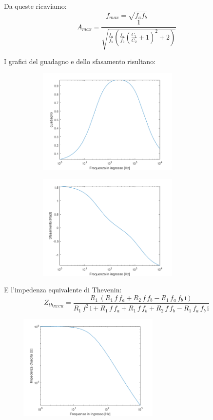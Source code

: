 Da queste ricaviamo:
\begin{equation}
    f_{max} = \sqrt{f_a f_b}
\end{equation}
\begin{equation}
    A_{max} = \frac{1}{\sqrt{\frac{f_a}{f_b}(\frac{f_a}{f_b}(\frac{C_1}{C_2} + 1)^2 + 2)}}
\end{equation}

I grafici del guadagno e dello sfasamento risultano:
\begin{figure}[H]
\caption{}
	\centering
	\begin{subfigure}
	\centering
		\includegraphics[width=7cm]{settimana_2/immagini/RCCRguadagno.png}
	\end{subfigure}
	\begin{subfigure}
	\centering
		\includegraphics[width=7cm]{settimana_2/immagini/RCCRsfasamento.png}
	\end{subfigure}
\end{figure}

E l'impedenza equivalente di Thevenin:
\begin{equation}
    Z_{th_{RCCR}} = \frac{R_1 \,{\left(R_1 \,f\,f_a +R_2 \,f\,f_b -R_1 \,f_a \,f_b \,\mathrm{i}\right)}}{R_1 \,f^2 \,\mathrm{i}+R_1 \,f\,f_a +R_1 \,f\,f_b +R_2 \,f\,f_b -R_1 \,f_a \,f_b \,\mathrm{i}}
\end{equation}
\begin{figure}[H]
\caption{}
    \includegraphics[width=7cm]{settimana_2/immagini/RCCRRth.png}
    \centering
\end{figure}

